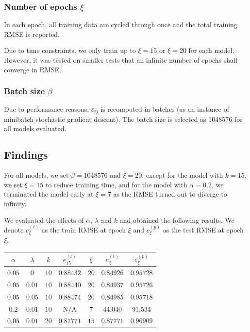 \documentclass[final]{cvpr}
\begin{document}
\subsubsection{Number of epochs $\xi$}
In each epoch, all training data are cycled through once
and the total training RMSE is reported.

Due to time constraints, we only train up to $\xi=15$ or $\xi=20$ for each model.
However, it was tested on smaller tests that
an infinite number of epochs shall converge in RMSE.

\subsubsection{Batch size $\beta$}
Due to performance reasons, $\varepsilon_{ij}$ is recomputed in batches
(as an instance of minibatch stochastic gradient descent).
The batch size is selected as $1048576$ for all models evaluated.

\subsection{Findings}
For all models, we set $\beta=1048576$ and $\xi=20$,
except for the model with $k=15$, we set $\xi=15$ to reduce training time,
and for the model with $\alpha=0.2$, we terminated the model early at $\xi=7$
as the RMSE turned out to diverge to infinity.

We evaluated the effects of $\alpha$, $\lambda$ and $k$ and obtained the following results.
We denote $e_\xi^{(t)}$ as the train RMSE at epoch $\xi$
and $e_\xi^{(p)}$ as the test RMSE at epoch $\xi$.

\hspace{-0.5cm}
\begin{tabular}{|c|c|c|c|c|c|c|}
	\hline
	$\alpha$ & $\lambda$ & $k$ & $e_{15}^{(t)}$ & $\xi$ & $e_\xi^{(t)}$ & $e_\xi^{(p)}$
	\\ \hline
	$0.05$ & $0$ & $10$ & $0.88432$ & $20$ & $0.84926$ & $0.95728$
	\\ \hline
	$0.05$ & $0.01$ & $10$ & $0.88440$ & $20$ & $0.84937$ & $0.95726$
	\\ \hline
	$0.05$ & $0.05$ & $10$ & $0.88474$ & $20$ & $0.84985$ & $0.95718$
	\\ \hline
	$0.2$ & $0.01$ & $10$ & N/A & $7$ & $44.040$ & $91.534$
	\\ \hline
	$0.05$ & $0.01$ & $20$ & $0.87771$ & $15$ & $0.87771$ & $0.96909$
	\\ \hline
\end{tabular}
\end{document}
